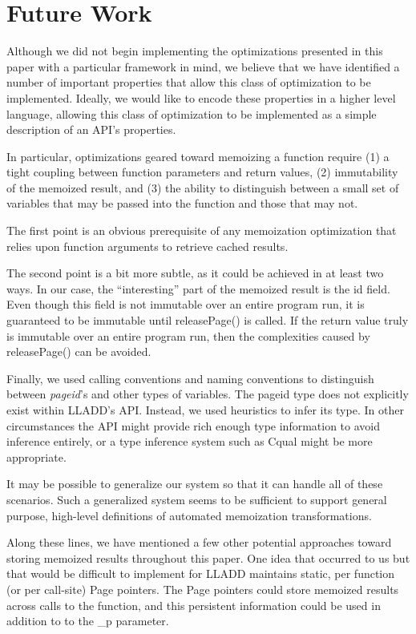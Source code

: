 \documentclass[10pt,letterpaper,twocolumn,english]{article}
\newcommand{\yad}{LLADD\xspace}
\newcommand{\unpin}{releasePage()\xspace}
\newcommand{\PP}{\_p\xspace}
\begin{document}
\section{Future Work}
Although we did not begin implementing the optimizations presented in
this paper with a particular framework in mind, we believe that we
have identified a number of important properties that allow this class
of optimization to be implemented.  Ideally, we would like to encode
these properties in a higher level language, allowing this class of 
optimization to be implemented as a simple description of an API's properties.

In particular, optimizations geared toward memoizing a function require
(1) a tight coupling between function parameters and return values,
(2) immutability of the memoized result, and (3) the ability to distinguish
between a small set of variables that may be passed into the function
and those that may not.

The first point is an obvious prerequisite of any memoization
optimization that relies upon function arguments to retrieve cached
results.  

The second point is a bit more subtle, as it could be
achieved in at least two ways.  In our case, the ``interesting'' part of the
memoized result is the id field.  Even
though this field is not immutable over an entire program run, it is
guaranteed to be immutable until \unpin is called.  If the return
value truly is immutable over an entire program run, then the
complexities caused by \unpin can be avoided.

Finally, we used calling conventions and naming conventions to
distinguish between {\em pageid}'s and other types of variables.  The
pageid type does not explicitly exist within \yad's API.  Instead, we
used heuristics to infer its type.  In other circumstances the API
might provide rich enough type information to avoid inference
entirely, or a type inference system such as Cqual might be more
appropriate.

It may be possible to generalize our system so that it can handle all
of these scenarios.  Such a generalized system seems to be sufficient
to support general purpose, high-level definitions of automated
memoization transformations.

Along these lines, we have mentioned a few other potential approaches
toward storing memoized results throughout this paper.  One idea that
occurred to us but that would be difficult to implement for \yad
maintains static, per function (or per call-site) Page pointers.  The
Page pointers could store memoized results across calls to the
function, and this persistent information could be used in addition to to
the \PP parameter.
\end{document}
